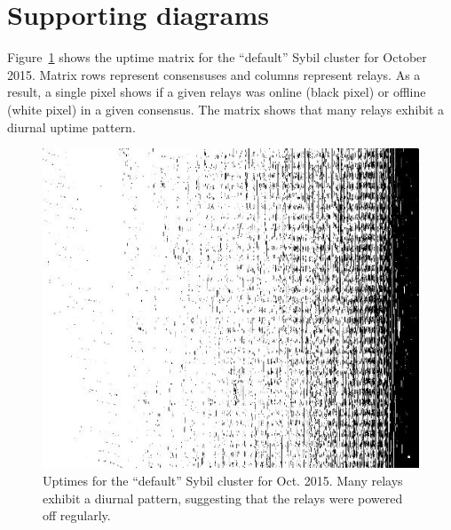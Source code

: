 \appendix

\section{Supporting diagrams}
Figure~\ref{fig:default-sybils-uptime} shows the uptime matrix for the
``default'' Sybil cluster for October 2015.  Matrix rows represent consensuses and
columns represent relays.  As a result, a single pixel shows if a given relays
was online (black pixel) or offline (white pixel) in a given consensus.  The
matrix shows that many relays exhibit a diurnal uptime pattern.

\begin{figure}[t]
	\centering
	\includegraphics[width=\linewidth]{diagrams/default-sybils-2015-10.jpg}
	\caption{Uptimes for the ``default'' Sybil cluster for Oct. 2015.  Many
	relays exhibit a diurnal pattern, suggesting that the relays were powered
	off regularly.}
	\label{fig:default-sybils-uptime}
\end{figure}
